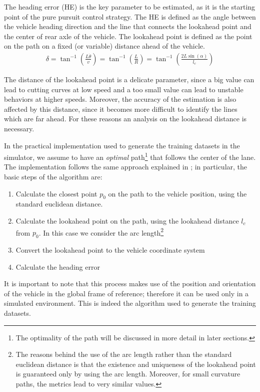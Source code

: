 \documentclass[a4paper,12pt,sort&compress]{article}
\begin{document}
    The heading error (HE) is the key parameter to be estimated, as it is the
    starting point of the pure pursuit control strategy\citep{7796574,9368694}.
    The HE is defined as the angle between the vehicle heading direction and the
    line that connects the lookahead point and the center of rear axle of the
    vehicle. The lookahead point is defined as the point on the path on a fixed (or
    variable) distance ahead of the vehicle. 
    \begin{align}
        \delta=\tan^{-1}\left(\frac{L\dot{\theta}}{v}\right)=\tan^{-1}\left(\frac{L}{R}\right)=\tan^{-1}\left(\frac{2L\sin\left(\alpha\right)}{l_{c}}\right)
    \end{align}

    The distance of the lookahead point
    is a delicate parameter, since a big value can lead to cutting curves at low
    speed and a too small value can lead to unstable behaviors at higher speeds.
    Moreover, the accuracy of the estimation is also affected by this distance,
    since it becomes more difficult to identify the lines which are far ahead.
    For these reasons an analysis on the lookahead distance is necessary. 

    In the practical implementation used to generate the training datasets in
    the simulator, we assume to have an \textit{optimal} path\footnote{The optimality of the path will be discussed in
    more detail in later sections.} that follows the center of the lane. The
    implementation follows the same approach explained in
    \citep*{coulter1992implementation}; in particular, the basic steps of the
    algorithm are:
    \begin{enumerate}
        \item Calculate the closest point $p_0$ on the path to the vehicle position,
        using the standard euclidean distance.
        \item Calculate the lookahead point on the path, using the lookahead
        distance $l_c$ from $p_0$. In this case we consider the arc
        length\footnote{The reasons behind the use of the arc length rather than
        the standard euclidean distance is that the existence and uniqueness of
        the lookahead point is guaranteed only by using the arc length.
        Moreover, for small curvature paths, the metrics lead to very similar values.}
        \item Convert the lookahead point to the vehicle coordinate system
        \item Calculate the heading error
    \end{enumerate}
    It is important to note that this process makes use of the position and
    orientation of the vehicle in the global frame of reference; therefore it
    can be used only in a simulated environment. This is indeed the algorithm
    used to generate the training datasets. 
\end{document}
